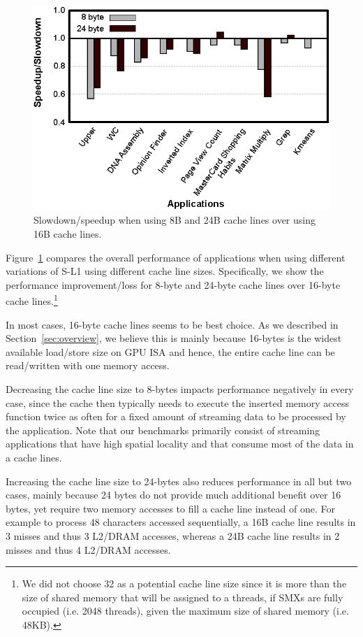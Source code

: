 \begin{figure}[t]
\center
\includegraphics[scale=0.88]{6differentCachelineSizes.eps}
\vspace{-0.0cm}
\caption{\footnotesize\textnormal{Slowdown/speedup when using 8B and 24B cache lines over using 16B cache lines.}}
\label{fig:cachelinesize}
\end{figure}

Figure~\ref{fig:cachelinesize} compares the overall performance of applications when using different variations of S-L1 using different cache line sizes. 
Specifically, we show the performance improvement/loss for 8-byte and 24-byte cache lines over
16-byte cache lines.\footnote{We did not choose 32 as a potential cache line size since it is more
than the size of shared memory that will be assigned to a threads, if SMXs are fully occupied (i.e.
2048 threads), given the maximum size of shared memory (i.e. 48KB).}

In most cases, 16-byte cache lines seems to be best choice. 
As we described in Section~\ref{sec:overview}, we believe this is mainly because 16-bytes is the widest available load/store size on GPU ISA and hence, the entire cache line can be read/written with one memory access.

Decreasing the cache line size to 8-bytes impacts performance negatively in every case, since the cache then typically needs to execute the inserted memory access function twice as often for a fixed amount of streaming data to be processed by the application. 
Note that our benchmarks primarily consist of streaming applications that have high spatial locality and that consume most of the data in a cache lines.

Increasing the cache line size to 24-bytes also reduces performance in all but two cases, mainly
because 24 bytes do not provide much additional benefit over 16 bytes, yet require two memory accesses to fill a cache line instead of one.
For example to process 48 characters accessed sequentially, a 16B cache line results in 3 misses and thus 3 L2/DRAM accesses, whereas a 24B cache line results in 2 misses and thus 4 L2/DRAM accesses.




